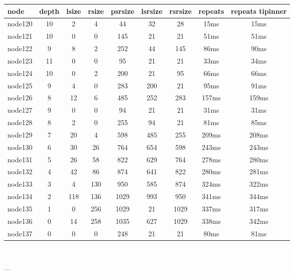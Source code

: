 \begin{tabular}{|l|c|c|c|c|c|c|c|c|}
\hline node & depth & lsize & rsize & psrsize & lsrsize & rsrsize   & repeats & repeats tipinner\\
    \hline node120 & 10 & 2 & 4 & 44 & 32 & 28 & 15ms & 15ms\\
    \hline node121 & 10 & 0 & 0 & 145 & 21 & 21 & 51ms & 51ms\\
    \hline node122 & 9 & 8 & 2 & 252 & 44 & 145 & 86ms & 90ms\\
    \hline node123 & 11 & 0 & 0 & 95 & 21 & 21 & 33ms & 34ms\\
    \hline node124 & 10 & 0 & 2 & 200 & 21 & 95 & 66ms & 66ms\\
    \hline node125 & 9 & 4 & 0 & 283 & 200 & 21 & 95ms & 91ms\\
    \hline node126 & 8 & 12 & 6 & 485 & 252 & 283 & 157ms & 159ms\\
    \hline node127 & 9 & 0 & 0 & 94 & 21 & 21 & 31ms & 31ms\\
    \hline node128 & 8 & 2 & 0 & 255 & 94 & 21 & 81ms & 85ms\\
    \hline node129 & 7 & 20 & 4 & 598 & 485 & 255 & 209ms & 208ms\\
    \hline node130 & 6 & 30 & 26 & 764 & 654 & 598 & 243ms & 243ms\\
    \hline node131 & 5 & 26 & 58 & 822 & 629 & 764 & 278ms & 280ms\\
    \hline node132 & 4 & 42 & 86 & 874 & 641 & 822 & 280ms & 281ms\\
    \hline node133 & 3 & 4 & 130 & 950 & 585 & 874 & 324ms & 322ms\\
    \hline node134 & 2 & 118 & 136 & 1029 & 993 & 950 & 341ms & 344ms\\
    \hline node135 & 1 & 0 & 256 & 1029 & 21 & 1029 & 337ms & 317ms\\
    \hline node136 & 0 & 14 & 258 & 1035 & 627 & 1029 & 338ms & 342ms\\
    \hline node137 & 0 & 0 & 0 & 248 & 21 & 21 & 80ms & 81ms\\

\hline
\end{tabular} \

---

